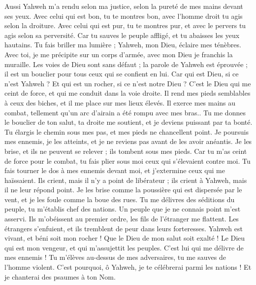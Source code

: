 \begin{multicols}{2}
Aussi Yahweh m'a rendu selon ma justice, selon la pureté de mes mains devant ses yeux.
Avec celui qui est bon, tu te montres bon, avec l'homme droit tu agis selon la droiture.
Avec celui qui est pur, tu te montres pur, et avec le pervers tu agis selon sa perversité.
Car tu sauves le peuple affligé, et tu abaisses les yeux hautains.
Tu fais briller ma lumière ; Yahweh, mon Dieu, éclaire mes ténèbres.
Avec toi, je me précipite sur un corps d'armée, avec mon Dieu je franchis la muraille.
Les voies de Dieu sont sans défaut ; la parole de Yahweh est éprouvée ; il est un bouclier pour tous ceux qui se confient en lui.
Car qui est Dieu, si ce n'est Yahweh ? Et qui est un rocher, si ce n'est notre Dieu ?
C'est le Dieu qui me ceint de force, et qui me conduit dans la voie droite.
Il rend mes pieds semblables à ceux des biches, et il me place sur mes lieux élevés.
Il exerce mes mains au combat, tellement qu'un arc d'airain a été rompu avec mes bras..
Tu me donnes le bouclier de ton salut, ta droite me soutient, et je deviens puissant par ta bonté.
Tu élargis le chemin sous mes pas, et mes pieds ne chancellent point.
Je poursuis mes ennemis, je les atteints, et je ne reviens pas avant de les avoir anéantis.
Je les brise, et ils ne peuvent se relever ; ils tombent sous mes pieds.
Car tu m'as ceint de force pour le combat, tu fais plier sous moi ceux qui s'élevaient contre moi.
Tu fais tourner le dos à mes ennemis devant moi, et j'extermine ceux qui me haïssaient.
Ils crient, mais il n'y a point de libérateur ; ils crient à Yahweh, mais il ne leur répond point.
Je les brise comme la poussière qui est dispersée par le vent, et je les foule comme la boue des rues.
Tu me délivres des séditions du peuple, tu m'établis chef des nations. Un peuple que je ne connais point m'est asservi.
Ils m'obéissent au premier ordre, les fils de l'étranger me flattent.
Les étrangers s'enfuient, et ils tremblent de peur dans leurs forteresses.
Yahweh est vivant, et béni soit mon rocher ! Que le Dieu de mon salut soit exalté !
Le Dieu qui est mon vengeur, et qui m'assujettit les peuples.
C'est lui qui me délivre de mes ennemis ! Tu m'élèves au-dessus de mes adversaires, tu me sauves de l'homme violent.
C'est pourquoi, ô Yahweh, je te célébrerai parmi les nations ! Et je chanterai des psaumes à ton Nom.

\end{multicols}
